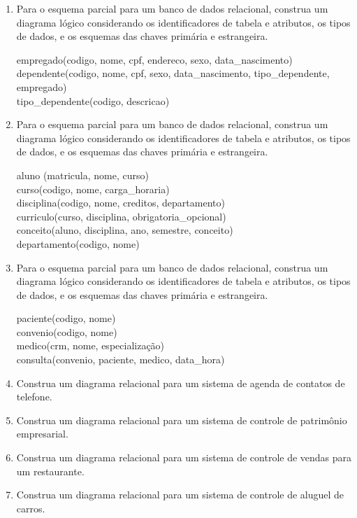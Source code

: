 \documentclass[11pt]{article}
\begin{document}
	\begin{enumerate}
		\item Para o esquema parcial para um banco de dados relacional, construa um diagrama lógico considerando os identificadores de tabela e atributos, os tipos de dados, e os esquemas das chaves primária e estrangeira.
		
		empregado(codigo, nome, cpf, endereco, sexo, data\_nascimento)\\
		dependente(codigo, nome, cpf, sexo, data\_nascimento, tipo\_dependente, empregado)\\
		tipo\_dependente(codigo, descricao)
		
		\item Para o esquema parcial para um banco de dados relacional, construa um diagrama lógico considerando os identificadores de tabela e atributos, os tipos de dados, e os esquemas das chaves primária e estrangeira.
		
		aluno (matricula, nome, curso)\\
		curso(codigo, nome, carga\_horaria)\\ 
		disciplina(codigo, nome, creditos, departamento)\\ 
		curriculo(curso, disciplina, obrigatoria\_opcional)\\ 
		conceito(aluno, disciplina, ano, semestre, conceito)\\ 
		departamento(codigo, nome)
		
		\item Para o esquema parcial para um banco de dados relacional, construa um diagrama lógico considerando os identificadores de tabela e atributos, os tipos de dados, e os esquemas das chaves primária e estrangeira.
				
		paciente(codigo, nome)\\
		convenio(codigo, nome)\\
		medico(crm, nome, especialização)\\
		consulta(convenio, paciente, medico, data\_hora)
		
		\item Construa um diagrama relacional para um sistema de agenda de contatos de telefone.
		
		\item Construa um diagrama relacional para um sistema de controle de patrimônio empresarial.
		
		\item Construa um diagrama relacional para um sistema de controle de vendas para um restaurante.
		
		\item Construa um diagrama relacional para um sistema de controle de aluguel de carros.
	\end{enumerate}
	
\end{document}
